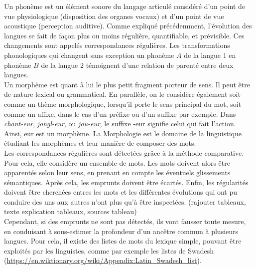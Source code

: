 \documentclass[12pt, french, twoside]{report}
\begin{document}
Un phonème est un élément sonore du langage articulé considéré d'un point de vue physiologique (disposition des organes vocaux) et d'un point de vue acoustique (perception auditive). 
Comme expliqué précédemment, l'évolution des langues se fait de façon plus ou moins régulière, quantifiable, et prévisible. 
Ces changements sont appelés correspondances régulières. Les transformations phonologiques qui changent sans exception un phonème $A$ de la langue $1$ en phonème $B$ de la langue $2$ témoignent d'une relation de parenté entre deux langues.\\
\indent Un morphème est quant à lui le plus petit fragment porteur de sens. Il peut être de nature lexical ou grammatical. En parallèle, on le considère également soit comme un thème morphologique, lorsqu'il porte le sens principal du mot, soit comme un affixe, dans le cas d'un préfixe ou d'un suffixe par exemple. Dans \textit{chant-eur}, \textit{jongl-eur}, ou \textit{jou-eur}, le suffixe  \og -eur \fg{} signifie celui qui fait l'action. Ainsi, \og eur \fg{} est un morphème. La Morphologie est le domaine de la linguistique étudiant les morphèmes et leur manière de composer des mots.\\

Les correspondances régulières sont détectées grâce à la méthode comparative. Pour cela, elle considère un ensemble de mots. Les mots doivent alors être apparentés selon leur sens, en prenant en compte les éventuels glissements sémantiques. Après cela, les emprunts doivent être écartés. Enfin, les régularités doivent être cherchées entres les mots et les différentes évolutions qui ont pu conduire des uns aux autres n'ont plus qu'à être inspectées. (rajouter tableaux, texte explication tableaux, sources tableau)\\

Cependant, si des emprunts ne sont pas détectés, ils vont fausser toute mesure, en conduisant à sous-estimer la profondeur d'un ancêtre commun à plusieurs langues. Pour cela, il existe des listes de mots du lexique simple, pouvant être exploités par les linguistes, comme par exemple les listes de Swadesh (\url{https://en.wiktionary.org/wiki/Appendix:Latin_Swadesh_list}).\\
\end{document}
